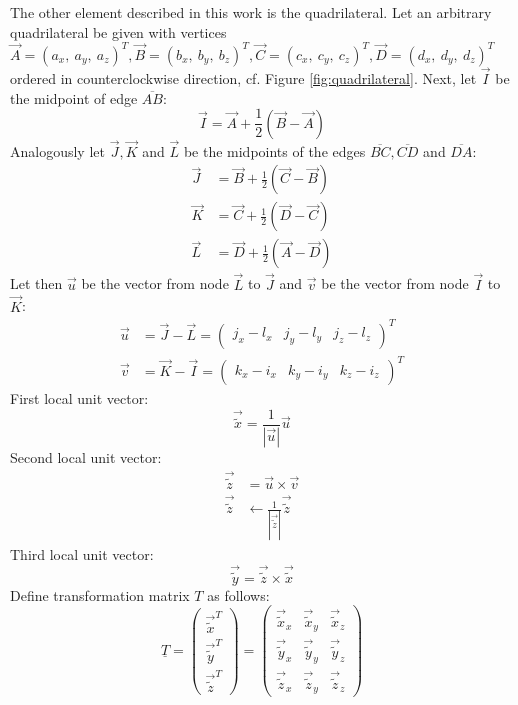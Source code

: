   The other element described in this work is the quadrilateral. Let an arbitrary quadrilateral be given with vertices $\vec{A} = (a_x,\ a_y,\ a_z)^T, \vec{B} = (b_x,\ b_y,\ b_z)^T, \vec{C} = (c_x,\ c_y,\ c_z)^T, \vec{D} = (d_x,\ d_y,\ d_z)^T$ ordered in counterclockwise direction, cf. Figure \ref{fig:quadrilateral}. Next, let $\vec{I}$ be the midpoint of edge $\overline{AB}$:
  \begin{equation*}
   \vec{I} = \vec{A} + \frac{1}{2}\left( \vec{B}-\vec{A}\right)
  \end{equation*}
  Analogously let $\vec{J}, \vec{K}$ and $\vec{L}$ be the midpoints of the edges $\overline{BC}, \overline{CD}$ and $\overline{DA}$:
  \begin{align*}
   \vec{J} &= \vec{B} + \frac{1}{2}\left( \vec{C}-\vec{B}\right) \\
   \vec{K} &= \vec{C} + \frac{1}{2}\left( \vec{D}-\vec{C}\right) \\
   \vec{L} &= \vec{D} + \frac{1}{2}\left( \vec{A}-\vec{D}\right)
  \end{align*}
  Let then $\vec{u}$ be the vector from node $\vec{L}$ to $\vec{J}$ and $\vec{v}$ be the vector from node $\vec{I}$ to $\vec{K}$:
  \begin{align*}
   \vec{u} &= \vec{J}-\vec{L} = \begin{pmatrix}
   j_x-l_x & j_y-l_y & j_z-l_z
   \end{pmatrix}^T\\
   \vec{v} &= \vec{K}-\vec{I} = \begin{pmatrix}
   k_x-i_x & k_y-i_y & k_z-i_z
   \end{pmatrix}^T
  \end{align*}
  First local unit vector:
  \begin{equation*}
   \vec{\tilde{x}} = \frac{1}{\left|\vec{u}\right|}\vec{u}
  \end{equation*}
  Second local unit vector:
  \begin{align*}
   \vec{\tilde{z}} &= \vec{u} \times \vec{v}\\
   \vec{\tilde{z}} &\leftarrow \frac{1}{\left|\vec{\tilde{z}}\right|}\vec{\tilde{z}}
  \end{align*}
  Third local unit vector:
  \begin{equation*}
   \vec{\tilde{y}} = \vec{\tilde{z}} \times \vec{\tilde{x}}
  \end{equation*}
  Define transformation matrix $T$ as follows:
  \begin{equation}\label{eq:trafoT_quad}
   \underline{T} = \begin{pmatrix}
   \vec{\tilde{x}}^T\\ \vec{\tilde{y}}^T\\ \vec{\tilde{z}}^T
   \end{pmatrix} = \begin{pmatrix}
   \vec{\tilde{x}}_x & \vec{\tilde{x}}_y & \vec{\tilde{x}}_z\\ \vec{\tilde{y}}_x & \vec{\tilde{y}}_y & \vec{\tilde{y}}_z\\ \vec{\tilde{z}}_x & \vec{\tilde{z}}_y & \vec{\tilde{z}}_z
   \end{pmatrix}
  \end{equation}

